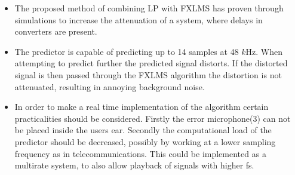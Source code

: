 \begin{itemize}
\item The proposed method of combining LP with FXLMS has proven through simulations to increase the attenuation of a system, where delays in converters are present. \\
\item The predictor is capable of predicting up to 14 samples at 48 $k$Hz. When attempting to predict further the predicted signal distorts. If the distorted signal is then passed through the FXLMS algorithm the distortion is not attenuated, resulting in annoying background noise.\\
\item In order to make a real time implementation of the algorithm certain practicalities should be considered. Firstly the error microphone(3) can not be placed inside the users ear. Secondly the computational load of the predictor should be decreased, possibly by working at a lower sampling frequency as in telecommunications. This could be implemented as a multirate system, to also allow playback of signals with higher fs. 
\end{itemize}
